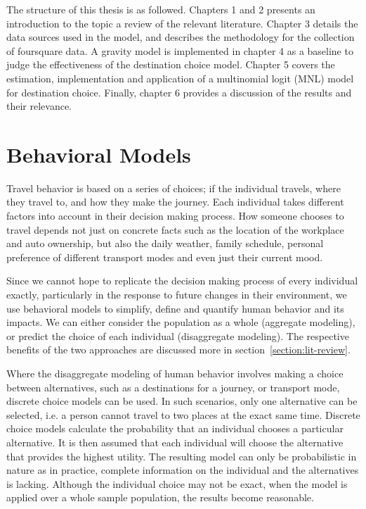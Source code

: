
The structure of this thesis is as followed. Chapters 1 and 2 presents an introduction to the topic a review of the relevant literature. Chapter 3 details the data sources used in the model, and describes the methodology for the collection of foursquare data. A gravity model is implemented in chapter 4 as a baseline to judge the effectiveness of  the destination choice model. Chapter 5 covers the estimation, implementation and application of a multinomial logit (MNL) model for destination choice. Finally, chapter 6 provides a discussion of the results and their relevance.
	
\section{Behavioral Models}
Travel behavior is based on a series of choices; if the individual travels, where they travel to, and how they make the journey. Each individual takes different factors into account in their decision making process. How someone chooses to travel depends not just on concrete facts such as the location of the workplace and auto ownership, but also the daily weather, family schedule, personal preference of different transport modes and even just their current mood.

Since we cannot hope to replicate the decision making process of every individual exactly, particularly in the response to future changes in their environment,  we use behavioral models to simplify, define and quantify human behavior and its impacts. We can either consider the population as a whole (aggregate modeling), or predict the choice of each individual (disaggregate modeling). The respective benefits of the two approaches are discussed more in section~\ref{section:lit-review}.

Where the disaggregate modeling of human behavior involves making a choice between alternatives, such as a destinations for a journey, or transport mode, discrete choice models can be used. In such scenarios, only one alternative can be selected, i.e. a person cannot travel to two places at the exact same time. Discrete choice models calculate the probability that an individual chooses a particular alternative. It is then assumed that each individual will choose the alternative that provides the highest utility. The resulting model can only be probabilistic in nature as in practice, complete information on the individual and the alternatives is lacking. Although the individual choice may not be exact, when the model is applied  over a whole sample population, the results become reasonable.  

